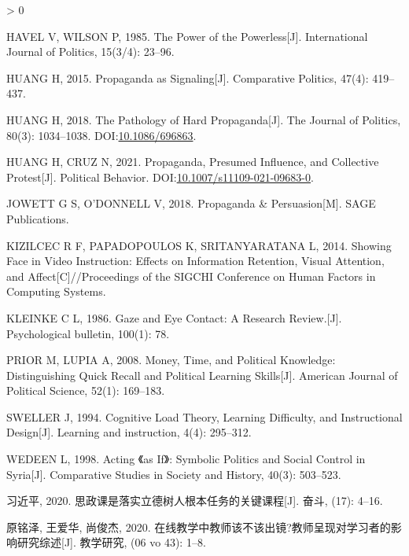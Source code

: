 \documentclass[
  12pt,
]{ctexart}
\newlength{\cslhangindent}
\newenvironment{CSLReferences}[2] %
 {%
  \setlength{\parindent}{0pt}
  \ifodd #1 \everypar{\setlength{\hangindent}{\cslhangindent}}\ignorespaces\fi
  \ifnum #2 > 0
  \setlength{\parskip}{#2\baselineskip}
  \fi
 }%
 {}
\begin{document}
\begin{CSLReferences}{1}{0}
\leavevmode\hypertarget{ref-HavelWilson1985}{}%
HAVEL V, WILSON P, 1985. The Power of the Powerless{[}J{]}. International Journal of Politics, 15(3/4): 23--96.

\leavevmode\hypertarget{ref-Huang2015a}{}%
HUANG H, 2015. Propaganda as {Signaling}{[}J{]}. Comparative Politics, 47(4): 419--437.

\leavevmode\hypertarget{ref-Huang2018}{}%
HUANG H, 2018. The {Pathology} of {Hard Propaganda}{[}J{]}. The Journal of Politics, 80(3): 1034--1038. DOI:\href{https://doi.org/10.1086/696863}{10.1086/696863}.

\leavevmode\hypertarget{ref-HuangCruz2021}{}%
HUANG H, CRUZ N, 2021. Propaganda, {Presumed Influence}, and {Collective Protest}{[}J{]}. Political Behavior. DOI:\href{https://doi.org/10.1007/s11109-021-09683-0}{10.1007/s11109-021-09683-0}.

\leavevmode\hypertarget{ref-JowettODonnell2018}{}%
JOWETT G S, O'DONNELL V, 2018. Propaganda \& {Persuasion}{[}M{]}. {SAGE Publications}.

\leavevmode\hypertarget{ref-KizilcecEtAl2014}{}%
KIZILCEC R F, PAPADOPOULOS K, SRITANYARATANA L, 2014. Showing Face in Video Instruction: Effects on Information Retention, Visual Attention, and Affect{[}C{]}//Proceedings of the {SIGCHI} Conference on Human Factors in Computing Systems.

\leavevmode\hypertarget{ref-Kleinke1986}{}%
KLEINKE C L, 1986. Gaze and Eye Contact: A Research Review.{[}J{]}. Psychological bulletin, 100(1): 78.

\leavevmode\hypertarget{ref-PriorLupia2008}{}%
PRIOR M, LUPIA A, 2008. Money, Time, and Political Knowledge: {Distinguishing} Quick Recall and Political Learning Skills{[}J{]}. American Journal of Political Science, 52(1): 169--183.

\leavevmode\hypertarget{ref-Sweller1994}{}%
SWELLER J, 1994. Cognitive Load Theory, Learning Difficulty, and Instructional Design{[}J{]}. Learning and instruction, 4(4): 295--312.

\leavevmode\hypertarget{ref-Wedeen1998}{}%
WEDEEN L, 1998. Acting {《as If》}: Symbolic Politics and Social Control in {Syria}{[}J{]}. Comparative Studies in Society and History, 40(3): 503--523.

\leavevmode\hypertarget{ref-XiJinPing2020}{}%
习近平, 2020. {思政课是落实立德树人根本任务的关键课程}{[}J{]}. 奋斗, (17): 4--16.

\leavevmode\hypertarget{ref-YuanMingZeEtAl2020a}{}%
原铭泽, 王爱华, 尚俊杰, 2020. {在线教学中教师该不该出镜?{}{}教师呈现对学习者的影响研究综述}{[}J{]}. 教学研究, (06 vo 43): 1--8.


\end{CSLReferences}
\end{document}
